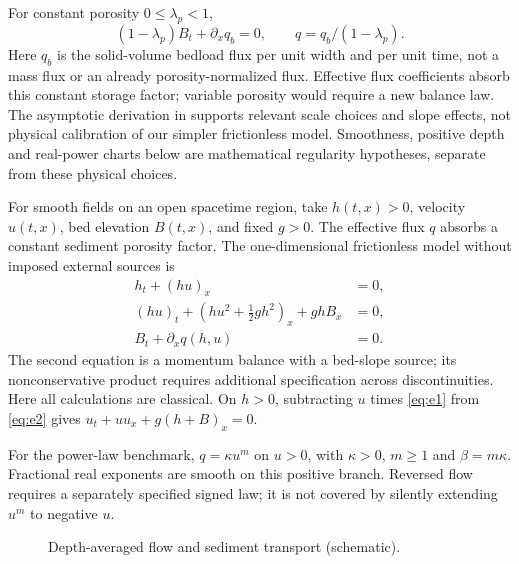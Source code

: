 \documentclass[11pt,a4paper,oneside]{report}
\numberwithin{equation}{chapter}
\begin{document}
For constant porosity $0\le\lambda_p<1$,
\begin{equation}\label{eq:porosity}
(1-\lambda_p)B_t+\partial_xq_b=0,\qquad q=q_b/(1-\lambda_p).
\end{equation}
Here $q_b$ is the solid-volume bedload flux per unit width and per unit time,
not a mass flux or an already porosity-normalized flux.
Effective flux coefficients absorb this constant storage factor; variable
porosity would require a new balance law.
The asymptotic derivation in \cite{fernandez2017} supports relevant scale
choices and slope effects, not physical calibration of our simpler
frictionless model. Smoothness, positive depth and real-power charts below
are mathematical regularity hypotheses, separate from these physical choices.

For smooth fields on an open spacetime region, take $h(t,x)>0$, velocity $u(t,x)$, bed elevation $B(t,x)$, and fixed $g>0$. The effective flux $q$ absorbs a constant sediment porosity factor. The one-dimensional frictionless model without imposed external sources is
\begin{align}
h_t+(hu)_x&=0,\label{eq:e1}\\
(hu)_t+(hu^2+\tfrac12gh^2)_x+ghB_x&=0,\label{eq:e2}\\
B_t+\partial_xq(h,u)&=0.\label{eq:e3}
\end{align}
The second equation is a momentum balance with a bed-slope source; its nonconservative product requires additional specification across discontinuities. Here all calculations are classical. On $h>0$, subtracting $u$ times \eqref{eq:e1} from \eqref{eq:e2} gives $u_t+uu_x+g(h+B)_x=0$.

For the power-law benchmark, $q=\kappa u^m$ on $u>0$, with $\kappa>0$, $m\ge1$ and $\beta=m\kappa$. Fractional real exponents are smooth on this positive branch. Reversed flow requires a separately specified signed law; it is not covered by silently extending $u^m$ to negative $u$.

\begin{figure}[htbp]\centering
{}
\caption{Depth-averaged flow and sediment transport (schematic).}\label{fig:physical}
\end{figure}
\end{document}
